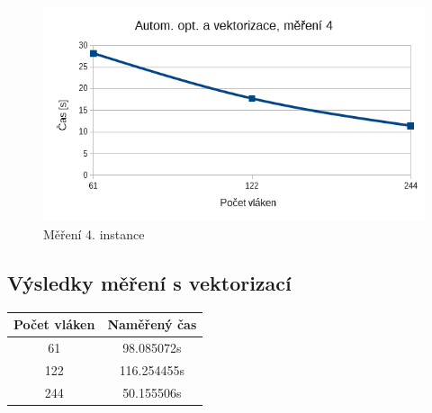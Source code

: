 \documentclass[12pt]{article}
\begin{document}
\begin{figure}[H]
  \begin{center}
      \includegraphics[width=12cm]{images/phi4.png}	
    \caption{Měření 4. instance} 
  \end{center}
\end{figure}

\subsection{Výsledky měření s vektorizací}
%
%
\begin{center}
\begin{tabular}{ c | c }
\textbf{Počet vláken} & \textbf{Naměřený čas} \\ \hline \hline 
61 & 98.085072s \\ \hline
122 & 116.254455s \\ \hline
244 & 50.155506s \\ \hline
\end{tabular}
\end{center}
\end{document}
